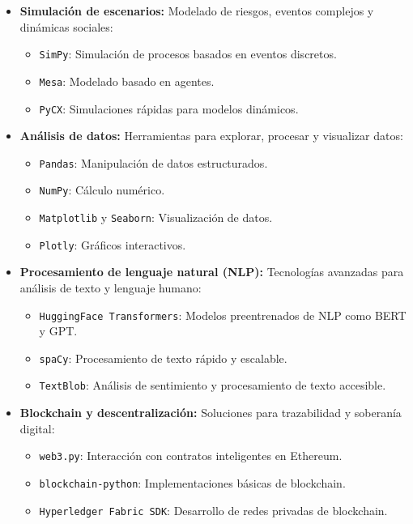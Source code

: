 \begin{refsection}
\begin{itemize}
    \item \textbf{Simulación de escenarios:}  
    Modelado de riesgos, eventos complejos y dinámicas sociales:
    \begin{itemize}
        \item \texttt{SimPy}: Simulación de procesos basados en eventos discretos.
        \item \texttt{Mesa}: Modelado basado en agentes.
        \item \texttt{PyCX}: Simulaciones rápidas para modelos dinámicos.
    \end{itemize}

    \item \textbf{Análisis de datos:}  
    Herramientas para explorar, procesar y visualizar datos:
    \begin{itemize}
        \item \texttt{Pandas}: Manipulación de datos estructurados.
        \item \texttt{NumPy}: Cálculo numérico.
        \item \texttt{Matplotlib} y \texttt{Seaborn}: Visualización de datos.
        \item \texttt{Plotly}: Gráficos interactivos.
    \end{itemize}

    \item \textbf{Procesamiento de lenguaje natural (NLP):}  
    Tecnologías avanzadas para análisis de texto y lenguaje humano:
    \begin{itemize}
        \item \texttt{HuggingFace Transformers}: Modelos preentrenados de NLP como BERT y GPT.
        \item \texttt{spaCy}: Procesamiento de texto rápido y escalable.
        \item \texttt{TextBlob}: Análisis de sentimiento y procesamiento de texto accesible.
    \end{itemize}

    \item \textbf{Blockchain y descentralización:}  
    Soluciones para trazabilidad y soberanía digital:
    \begin{itemize}
        \item \texttt{web3.py}: Interacción con contratos inteligentes en Ethereum.
        \item \texttt{blockchain-python}: Implementaciones básicas de blockchain.
        \item \texttt{Hyperledger Fabric SDK}: Desarrollo de redes privadas de blockchain.
    \end{itemize}


\end{itemize}
\end{refsection}

